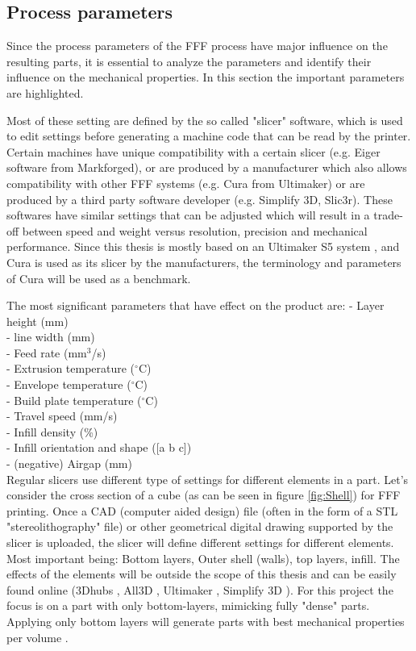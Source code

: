\subsection{Process parameters}
    \label{Process parameters}
Since the process parameters of the FFF process have major influence on the resulting parts, it is essential to analyze the parameters and identify their influence on the mechanical properties. In this section the important parameters are highlighted.

Most of these setting are defined by the so called "slicer" software, which is used to edit settings before generating a machine code that can be read by the printer. Certain machines have unique compatibility with a certain slicer (e.g. Eiger software from Markforged), or are produced by a manufacturer which also allows compatibility with other FFF systems (e.g. Cura from Ultimaker) or are produced  by a third party software developer (e.g. Simplify 3D, Slic3r). These softwares have similar settings that can be adjusted which will result in a  trade-off between speed and weight versus resolution, precision and mechanical performance. Since this thesis is mostly based on an Ultimaker S5 system \cite{Ultimaker2019UltimakerSheet}, and Cura is used as its slicer by the manufacturers, the terminology and parameters of Cura will be used as a benchmark. 

The most significant parameters that have effect on the product are:
- Layer height (mm)\\
- line width (mm)\\
- Feed rate (mm$^3$/s)\\
- Extrusion temperature ($^{\circ}$C)\\
- Envelope temperature ($^{\circ}$C)\\
- Build plate temperature ($^{\circ}$C)\\
- Travel speed (mm/s)\\
- Infill density (\%)\\
- Infill orientation and shape ([a b c])\\
- (negative) Airgap (mm)\\


Regular slicers use different type of settings for  different elements in a part. Let's consider the cross section of a cube (as can be seen in figure \ref{fig:Shell}) for FFF printing. Once a CAD (computer aided design) file (often in the form of a STL "stereolithography" file) or other geometrical digital drawing supported by the slicer is uploaded, the slicer will define different settings for different elements. Most important being: Bottom layers, Outer shell (walls), top layers, infill. The effects of the  elements will be outside the scope of this thesis and can be easily found online (3Dhubs \cite{3DHubsIntroductionPrinting}, All3D \cite{all3dpAll3dp}, Ultimaker \cite{Ultimaker2019UltimakerSheet}, Simplify 3D \cite{Simplefy3DPrintGuide}). For this project the focus is on a part with only bottom-layers, mimicking fully "dense" parts. Applying only bottom layers will generate parts with best mechanical properties per volume \cite{Li2017TheProperties}.


